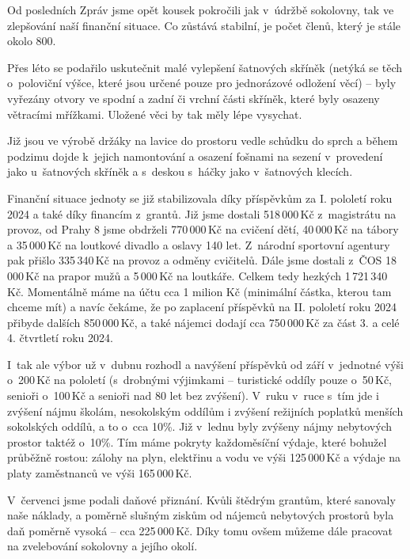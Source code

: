 \documentclass[11pt]{article}
\begin{document}
\clearpage
\pagestyle{standard}



Od posledních Zpráv jsme opět kousek pokročili jak v~údržbě sokolovny, tak ve zlepšování naší finanční situace. Co zůstává stabilní, je počet členů, který je stále okolo 800.

Přes léto se podařilo uskutečnit malé vylepšení šatnových skříněk (netýká se těch o~poloviční výšce, které jsou určené pouze pro jednorázové odložení věcí) – byly vyřezány otvory ve spodní a zadní či vrchní části skříněk, které byly osazeny větracími mřížkami. Uložené věci by tak měly lépe vysychat.

Již jsou ve výrobě držáky na lavice do prostoru vedle schůdku do sprch a během podzimu dojde k~jejich namontování a osazení fošnami na sezení v~provedení jako u~šatnových skříněk a s~deskou s~háčky jako v~šatnových klecích.

Finanční situace jednoty se již stabilizovala díky příspěvkům za I. pololetí roku 2024 a také díky financím z~grantů. Již jsme dostali 518\,000\,Kč z~magistrátu na provoz, od Prahy 8 jsme obdrželi 770\,000\,Kč na cvičení dětí, 40\,000\,Kč na tábory a 35\,000\,Kč na loutkové divadlo a oslavy 140 let. Z~národní sportovní agentury pak přišlo 335\,340\,Kč na provoz a odměny cvičitelů. Dále jsme dostali z~ČOS 18\,000\,Kč na prapor mužů a 5\,000\,Kč na loutkáře. Celkem tedy hezkých 1\,721\,340 Kč. Momentálně máme na účtu cca 1 milion Kč (minimální částka, kterou tam chceme mít) a navíc čekáme, že po zaplacení příspěvků na II. pololetí roku 2024 přibyde dalších 850\,000\,Kč, a také nájemci dodají cca 750\,000\,Kč za část 3. a celé 4. čtvrtletí roku 2024.

I~tak ale výbor už v~dubnu rozhodl a navýšení příspěvků od září v~jednotné výši o~200\,Kč na pololetí (s~drobnými výjimkami – turistické oddíly pouze o~50\,Kč, senioři o~100\,Kč a senioři nad 80 let bez zvýšení). V~ruku v~ruce s~tím jde i zvýšení nájmu školám, nesokolským oddílům i zvýšení režijních poplatků menších sokolských oddílů, a to o~cca 10\%. Již v~lednu byly zvýšeny nájmy nebytových prostor taktéž o~10\%. Tím máme pokryty každoměsíční výdaje, které bohužel průběžně rostou: zálohy na plyn, elektřinu a vodu ve výši 125\,000\,Kč a výdaje na platy zaměstnanců ve výši 165\,000\,Kč.

V~červenci jsme podali daňové přiznání. Kvůli štědrým grantům, které sanovaly naše náklady, a poměrně slušným ziskům od nájemců nebytových prostorů byla daň poměrně vysoká – cca 225\,000\,Kč. Díky tomu ovšem můžeme dále pracovat na zvelebování sokolovny a jejího okolí.
\end{document}
